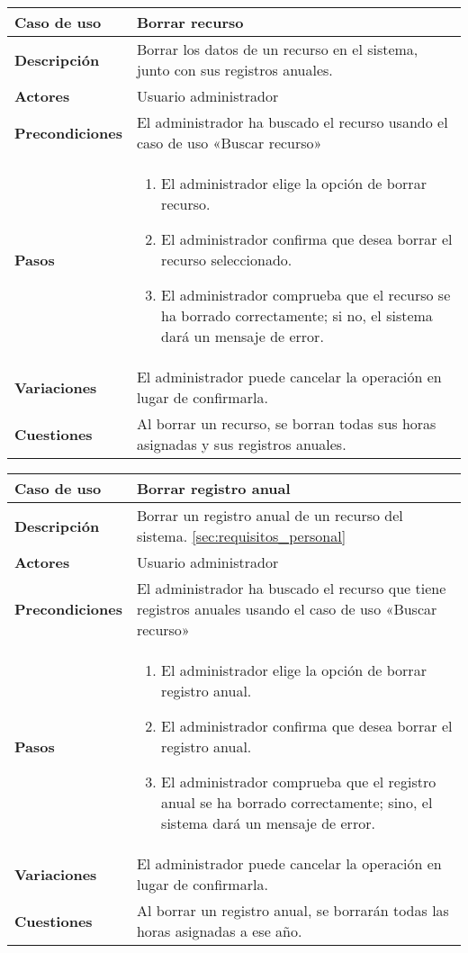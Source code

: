 \begin{tabular}{|p{1.25in}|p{3.65in}|}\hline
\textbf{Caso de uso} & \textbf{Borrar recurso}\\\hline\hline
\textbf{Descripción} & Borrar los datos de un recurso en el sistema, junto con
sus registros anuales. \\\hline
\textbf{Actores} & Usuario administrador\\\hline
\textbf{Precondiciones} & El administrador ha
buscado el recurso usando el caso de uso «Buscar recurso»\\\hline
\textbf{Pasos} & 
  \begin{enumerate}
   \item El administrador elige la opción de borrar recurso.
   \item El administrador confirma que desea borrar el recurso seleccionado.
   \item El administrador comprueba que el recurso se ha borrado
correctamente; si no, el sistema dará un mensaje de error.
  \end{enumerate}
\\\hline
\textbf{Variaciones} & El administrador puede cancelar la operación en lugar
de confirmarla.\\\hline
\textbf{Cuestiones} & Al borrar un recurso, se borran todas sus horas asignadas
y sus registros anuales.\\\hline
\end{tabular}

\begin{tabular}{|p{1.25in}|p{3.65in}|}\hline
\textbf{Caso de uso} & \textbf{Borrar registro anual}\\\hline\hline
\textbf{Descripción} & Borrar un registro anual de un recurso
del sistema.
\ref{sec:requisitos_personal}\\\hline
\textbf{Actores} & Usuario administrador\\\hline
\textbf{Precondiciones} & El administrador ha buscado el recurso que tiene
registros anuales usando el caso de uso «Buscar recurso»\\\hline
\textbf{Pasos} & 
  \begin{enumerate}
   \item El administrador elige la opción de borrar registro anual.
   \item El administrador confirma que desea borrar el registro anual.
   \item El administrador comprueba que el registro anual se ha borrado
correctamente; sino, el sistema dará un mensaje de error.
  \end{enumerate}
\\\hline
\textbf{Variaciones} & El administrador puede cancelar la operación en lugar
de confirmarla.\\\hline
\textbf{Cuestiones} & Al borrar un registro anual, se borrarán todas las
horas asignadas a ese año.\\\hline
\end{tabular}


